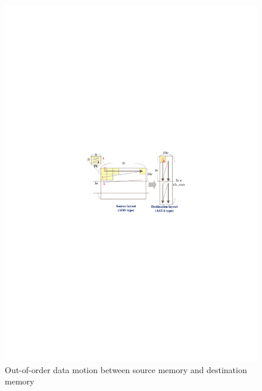 \documentclass[10pt,journal,compsoc]{IEEEtran}
\begin{document}
\begin{figure}[bt]
\begin{center}
\graphicspath{{picture/}}
\includegraphics[scale=0.8]{Out_of_Order_v2}
\caption{Out-of-order data motion between source memory and destination memory}
\label{fig:Out-of-Order}
\end{center}
\end{figure}
\end{document}

